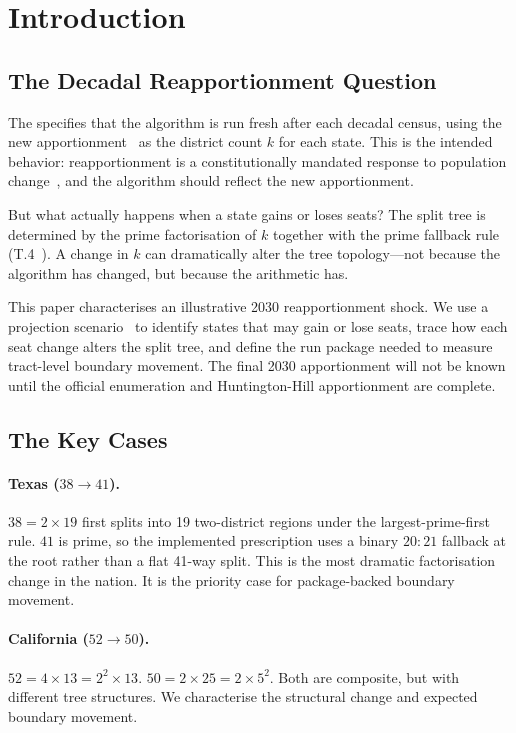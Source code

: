 \section{Introduction}
\label{sec:introduction}

\subsection{The Decadal Reapportionment Question}

The \dia{} specifies that the \ar{} algorithm is run fresh after each
decadal census, using the new \hh{} apportionment~\citep{huntington1928}
as the district count $k$ for each state.
This is the intended behavior: reapportionment is a constitutionally mandated
response to population change~\citep{wesberry1964}, and the algorithm
should reflect the new apportionment.

But what actually happens when a state gains or loses seats?
The \ar{} split tree is determined by the prime factorisation of $k$ together
with the prime fallback rule (T.4~\citep{b11paper}).
A change in $k$ can dramatically alter the tree topology---not because the
algorithm has changed, but because the arithmetic has.

This paper characterises an illustrative 2030 reapportionment shock.
We use a projection scenario~\citep{census2030proj} to identify states that
may gain or lose seats, trace how each seat change alters the \ar{} split
tree, and define the run package needed to measure tract-level boundary
movement.  The final 2030 apportionment will not be known until the official
enumeration and Huntington-Hill apportionment are complete.

\subsection{The Key Cases}

\paragraph{Texas ($38 \to 41$).}
$38 = 2 \times 19$ first splits into 19 two-district regions under the
largest-prime-first rule.
$41$ is prime, so the implemented prescription uses a binary $20:21$ fallback
at the root rather than a flat 41-way split.
This is the most dramatic factorisation change in the nation.
It is the priority case for package-backed boundary movement.

\paragraph{California ($52 \to 50$).}
$52 = 4 \times 13 = 2^2 \times 13$.
$50 = 2 \times 25 = 2 \times 5^2$.
Both are composite, but with different tree structures.
We characterise the structural change and expected boundary movement.

